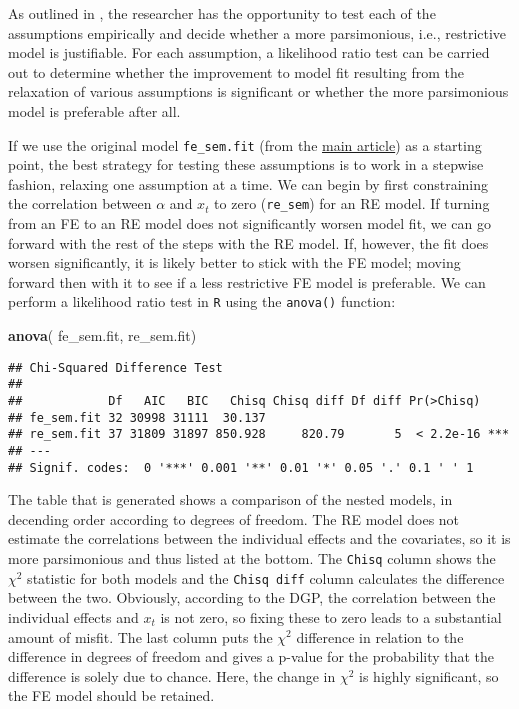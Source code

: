 \documentclass[]{interact}
\theoremstyle{plain}%
\theoremstyle{definition}
\theoremstyle{remark}
\newenvironment{Shaded}{\begin{snugshade}}{\end{snugshade}}
\newcommand{\KeywordTok}[1]{\textcolor[rgb]{0.13,0.29,0.53}{\textbf{#1}}}
\newcommand{\NormalTok}[1]{#1}
\begin{document}
\singlespacing

\doublespacing

As outlined in \citet{Bollen2010}, the researcher has the opportunity to
test each of the assumptions empirically and decide whether a more
parsimonious, i.e., restrictive model is justifiable. For each
assumption, a likelihood ratio test can be carried out to determine
whether the improvement to model fit resulting from the relaxation of
various assumptions is significant or whether the more parsimonious
model is preferable after all.

If we use the original model \texttt{fe\_sem.fit} (from the
\href{https://github.com/henrik-andersen/FE-SEM/blob/master/article.pdf}{main
article}) as a starting point, the best strategy for testing these
assumptions is to work in a stepwise fashion, relaxing one assumption at
a time. We can begin by first constraining the correlation between
\(\alpha\) and \(x_{t}\) to zero (\texttt{re\_sem}) for an RE model. If
turning from an FE to an RE model does not significantly worsen model
fit, we can go forward with the rest of the steps with the RE model. If,
however, the fit does worsen significantly, it is likely better to stick
with the FE model; moving forward then with it to see if a less
restrictive FE model is preferable. We can perform a likelihood ratio
test in \texttt{R} using the \texttt{anova()} function:

\small
\singlespacing

\begin{Shaded}
\begin{Highlighting}[]
\KeywordTok{anova}\NormalTok{( fe_sem.fit, re_sem.fit)}
\end{Highlighting}
\end{Shaded}

\begin{verbatim}
## Chi-Squared Difference Test
## 
##            Df   AIC   BIC   Chisq Chisq diff Df diff Pr(>Chisq)    
## fe_sem.fit 32 30998 31111  30.137                                  
## re_sem.fit 37 31809 31897 850.928     820.79       5  < 2.2e-16 ***
## ---
## Signif. codes:  0 '***' 0.001 '**' 0.01 '*' 0.05 '.' 0.1 ' ' 1
\end{verbatim}

\doublespacing
\normalsize

The table that is generated shows a comparison of the nested models, in
decending order according to degrees of freedom. The RE model does not
estimate the correlations between the individual effects and the
covariates, so it is more parsimonious and thus listed at the bottom.
The \texttt{Chisq} column shows the \(\chi^{2}\) statistic for both
models and the \texttt{Chisq\ diff} column calculates the difference
between the two. Obviously, according to the DGP, the correlation
between the individual effects and \(x_{t}\) is not zero, so fixing
these to zero leads to a substantial amount of misfit. The last column
puts the \(\chi^{2}\) difference in relation to the difference in
degrees of freedom and gives a p-value for the probability that the
difference is solely due to chance. Here, the change in \(\chi^{2}\) is
highly significant, so the FE model should be retained.
\end{document}
